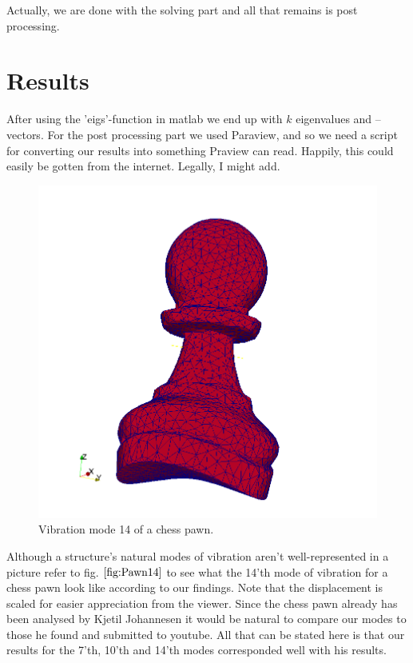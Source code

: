 \documentclass[paper=a4, fontsize=11pt]{scrartcl} %
\begin{document}
Actually, we are done with the solving part and all that remains is post processing.

\section*{Results}
After using the 'eigs'-function in matlab we end up with $k$ eigenvalues and --vectors. For the post processing part we used Paraview, and so we need a script for converting our results into something Praview can read. Happily, this could easily be gotten from the internet. Legally, I might add.
\begin{figure}
\centering
\includegraphics[scale=0.3]{PawnMode15.png}
\caption{Vibration mode 14 of a chess pawn.}
\label{fig:Pawn14}
\end{figure}
 Although a structure's natural modes of vibration aren't well-represented in a picture refer to fig. $\ref{fig:Pawn14}$ to see what the 14'th mode of vibration for a chess pawn look like according to our findings. Note that the displacement is scaled for easier appreciation from the viewer. Since the chess pawn already has been analysed by Kjetil Johannesen it would be natural to compare our modes to those he found and submitted to youtube. All that can be stated here is that our results for the 7'th, 10'th and 14'th modes corresponded well with his results.
\end{document}
